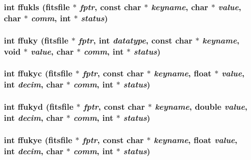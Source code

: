 \subsubsection{\setlength{\rightskip}{0pt plus 5cm}int ffukls (\bf{fitsfile} $\ast$ {\em fptr}, const char $\ast$ {\em keyname}, char $\ast$ {\em value}, char $\ast$ {\em comm}, int $\ast$ {\em status})}\label{src_2fitsio_8h_395b4140820c02fa55e498ddd6d95943}


\subsubsection{\setlength{\rightskip}{0pt plus 5cm}int ffuky (\bf{fitsfile} $\ast$ {\em fptr}, int {\em datatype}, const char $\ast$ {\em keyname}, void $\ast$ {\em value}, char $\ast$ {\em comm}, int $\ast$ {\em status})}\label{src_2fitsio_8h_a402f603cec33c59a9b6dec08dc7d35e}


\subsubsection{\setlength{\rightskip}{0pt plus 5cm}int ffukyc (\bf{fitsfile} $\ast$ {\em fptr}, const char $\ast$ {\em keyname}, float $\ast$ {\em value}, int {\em decim}, char $\ast$ {\em comm}, int $\ast$ {\em status})}\label{src_2fitsio_8h_ded0f88f0f2938fd23a49b55afd453c4}


\subsubsection{\setlength{\rightskip}{0pt plus 5cm}int ffukyd (\bf{fitsfile} $\ast$ {\em fptr}, const char $\ast$ {\em keyname}, double {\em value}, int {\em decim}, char $\ast$ {\em comm}, int $\ast$ {\em status})}\label{src_2fitsio_8h_07915bf0e4579bc324d213671d1d6f32}


\subsubsection{\setlength{\rightskip}{0pt plus 5cm}int ffukye (\bf{fitsfile} $\ast$ {\em fptr}, const char $\ast$ {\em keyname}, float {\em value}, int {\em decim}, char $\ast$ {\em comm}, int $\ast$ {\em status})}\label{src_2fitsio_8h_7d74546a4ae0316680f0d5b12899f2a5}


